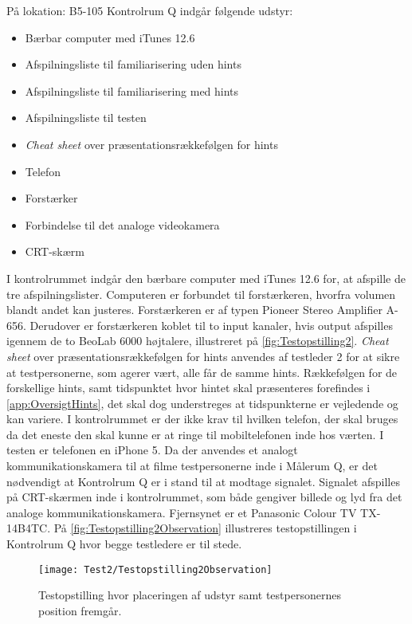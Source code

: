 \noindent
% 
På lokation: B5-105 Kontrolrum Q indgår følgende udstyr:
\begin{itemize}
  \item Bærbar computer med iTunes 12.6
  \item Afspilningsliste til familiarisering uden hints 
  \item Afspilningsliste til familiarisering med hints
  \item Afspilningsliste til testen
  \item \textit{Cheat sheet} over præsentationsrækkefølgen for hints 
  \item Telefon
  \item Forstærker 
  \item Forbindelse til det analoge videokamera
  \item CRT-skærm \blankline
\noindent
\end{itemize}
%
I kontrolrummet indgår den bærbare computer med iTunes 12.6 for, at afspille de tre afspilningslister. Computeren er forbundet til forstærkeren, hvorfra volumen blandt andet kan justeres. Forstærkeren er af typen Pioneer Stereo Amplifier A-656. Derudover er forstærkeren koblet til to input kanaler, hvis output afspilles igennem de to BeoLab 6000 højtalere, illustreret på \autoref{fig:Testopstilling2}. \textit{Cheat sheet} over præsentationsrækkefølgen for hints anvendes af testleder 2 for at sikre at testpersonerne, som agerer vært, alle får de samme hints. Rækkefølgen for de forskellige hints, samt tidspunktet hvor hintet skal præsenteres forefindes i \autoref{app:OversigtHints}, det skal dog understreges at tidspunkterne er vejledende og kan variere. I kontrolrummet er der ikke krav til hvilken telefon, der skal bruges da det eneste den skal kunne er at ringe til mobiltelefonen inde hos værten. I testen er telefonen en iPhone 5. Da der anvendes et analogt kommunikationskamera til at filme testpersonerne inde i Målerum Q, er det nødvendigt at Kontrolrum Q er i stand til at modtage signalet. Signalet afspilles på CRT-skærmen inde i kontrolrummet, som både gengiver billede og lyd fra det analoge kommunikationskamera. Fjernsynet er et Panasonic Colour TV TX-14B4TC. På \autoref{fig:Testopstilling2Observation} illustreres testopstillingen i Kontrolrum Q hvor begge testledere er til stede.   
%
\begin{figure}[H]
	\centering
	\texttt{[image: Test2/Testopstilling2Observation]}
	\caption{Testopstilling hvor placeringen af udstyr samt testpersonernes position fremgår.}
	\label{fig:Testopstilling2Observation}
\end{figure}
\noindent
% 


